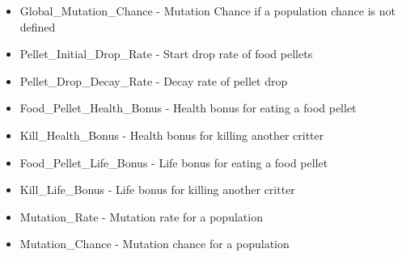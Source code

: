 \begin{itemize}[noitemsep]
	\item Global\_Mutation\_Chance - Mutation Chance if a population chance is not defined
	\item Pellet\_Initial\_Drop\_Rate - Start drop rate of food pellets
	\item Pellet\_Drop\_Decay\_Rate - Decay rate of pellet drop
	\item Food\_Pellet\_Health\_Bonus - Health bonus for eating a food pellet
	\item Kill\_Health\_Bonus - Health bonus for killing another critter
	\item Food\_Pellet\_Life\_Bonus - Life bonus for eating a food pellet
	\item Kill\_Life\_Bonus - Life bonus for killing another critter
	\item Mutation\_Rate - Mutation rate for a population
	\item Mutation\_Chance - Mutation chance for a population
\end{itemize}
